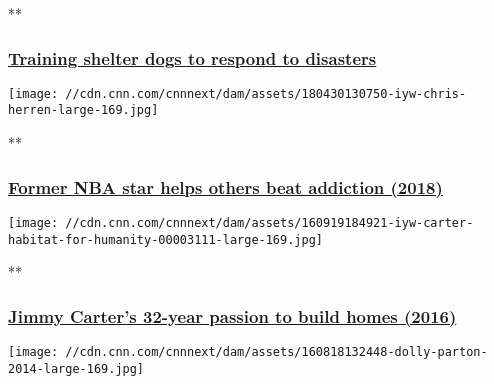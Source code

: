 **

\hypertarget{training-shelter-dogs-to-respond-to-disasters}{%
\subsubsection{\texorpdfstring{\href{/videos/tv/2018/05/08/iyw-national-disaster-search-dog-foundation.cnn/video/playlists/impact-your-world/}{Training
shelter dogs to respond to
disasters}}{Training shelter dogs to respond to disasters}}\label{training-shelter-dogs-to-respond-to-disasters}}

\href{/videos/tv/2018/04/30/iyw-herren-project.cnn/video/playlists/impact-your-world/}{}

\texttt{[image: //cdn.cnn.com/cnnnext/dam/assets/180430130750-iyw-chris-herren-large-169.jpg]}

**

\hypertarget{former-nba-star-helps-others-beat-addiction-2018}{%
\subsubsection{\texorpdfstring{\href{/videos/tv/2018/04/30/iyw-herren-project.cnn/video/playlists/impact-your-world/}{Former
NBA star helps others beat addiction
(2018)}}{Former NBA star helps others beat addiction (2018)}}\label{former-nba-star-helps-others-beat-addiction-2018}}

\href{/videos/tv/2016/09/19/iyw-carter-habitat-for-humanity.cnn/video/playlists/impact-your-world/}{}

\texttt{[image: //cdn.cnn.com/cnnnext/dam/assets/160919184921-iyw-carter-habitat-for-humanity-00003111-large-169.jpg]}

**

\hypertarget{jimmy-carters-32-year-passion-to-build-homes-2016}{%
\subsubsection{\texorpdfstring{\href{/videos/tv/2016/09/19/iyw-carter-habitat-for-humanity.cnn/video/playlists/impact-your-world/}{Jimmy
Carter's 32-year passion to build homes
(2016)}}{Jimmy Carter's 32-year passion to build homes (2016)}}\label{jimmy-carters-32-year-passion-to-build-homes-2016}}

\href{/videos/tv/2016/10/28/iyw-dolly-parton-imagination-library.cnn/video/playlists/impact-your-world/}{}

\texttt{[image: //cdn.cnn.com/cnnnext/dam/assets/160818132448-dolly-parton-2014-large-169.jpg]}

